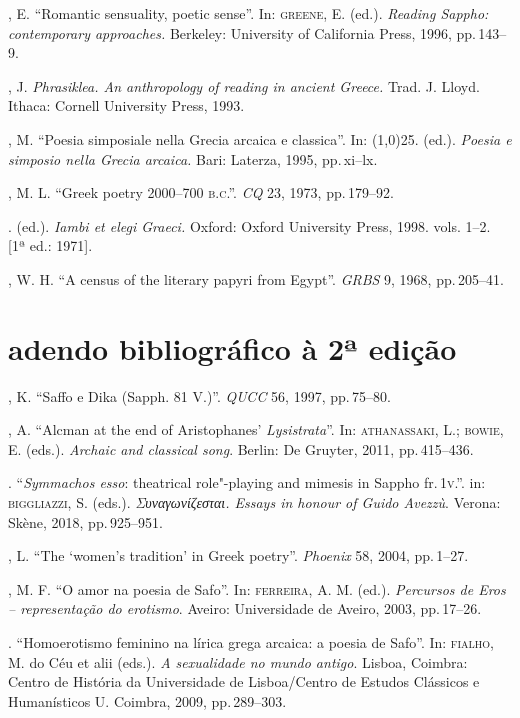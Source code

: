 \begin{bibliohedra}
, E. “Romantic sensuality, poetic sense”. In: \textsc{greene}, E.
(ed.). \emph{Reading Sappho: contemporary approaches.} Berkeley: University
of California Press, 1996, pp.\,143--9.

, J. \emph{Phrasiklea. An anthropology of reading in ancient
Greece.} Trad. J. Lloyd. Ithaca: Cornell University Press, 1993.

, M. “Poesia simposiale nella Grecia arcaica e classica”. In:
\line(1,0){25}. (ed.). \emph{Poesia e simposio nella Grecia arcaica.}
Bari: Laterza, 1995, pp.\,xi--lx.

, M. L. “Greek poetry 2000--700 \textsc{b.c.”.} \emph{CQ} 23, 1973,
pp.\,179--92.

\titidem. (ed.). \emph{Iambi et elegi Graeci.} Oxford: Oxford University
Press, 1998. vols. 1--2. {[}1ª ed.: 1971{]}.

, W. H. “A census of the literary papyri from Egypt”.
\emph{GRBS} 9, 1968, pp.\,205--41.


\section*{adendo bibliográfico à 2ª edição}

, K. “Saffo e Dika (Sapph. 81 V.)”. \emph{QUCC} 56, 1997, pp.\,75--80.

, A. “Alcman at the end of Aristophanes' \emph{Lysistrata}”. In: \textsc{athanassaki}, L.; \textsc{bowie}, E. (eds.). \emph{Archaic and classical song}. Berlin: De Gruyter, 2011, pp.\,415--436.

\titidem.  “\emph{Symmachos esso}: theatrical role"-playing and mimesis in Sappho fr.\,1\textsc{v}.”. in: \textsc{biggliazzi}, S. (eds.). \emph{Συναγωνίζεσται. Essays in honour of Guido Avezzù}. Verona: Skène, 2018, pp.\,925--951.


, L. “The ‘women’s tradition’ in Greek poetry”. \emph{Phoenix} 58, 2004, pp.\,1--27.

, M. F. “O amor na poesia de Safo”. In: \textsc{ferreira}, A. M. (ed.). \emph{Percursos de Eros -- representação do erotismo}. Aveiro: Universidade de Aveiro, 2003, pp.\,17--26.

\titidem. “Homoerotismo feminino na lírica grega arcaica: a poesia de Safo”. In: \textsc{fialho}, M. do Céu et alii (eds.). \emph{A sexualidade no mundo antigo}. Lisboa, Coimbra: Centro de História da Universidade de Lisboa/Centro de Estudos Clássicos e Humanísticos U. Coimbra, 2009, pp.\,289--303. 


\end{bibliohedra}
